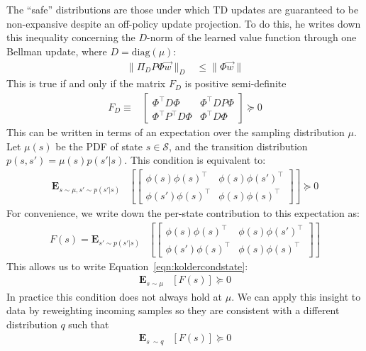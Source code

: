 \documentclass[11pt]{article}
\newcommand{\E}{\textbf{E}}
\begin{document}
The ``safe'' distributions are those under which TD updates are guaranteed to be non-expansive despite an off-policy update projection. To do this, he writes down this inequality concerning the $D$-norm of the learned value function through one Bellman update, where $D=\text{diag}(\mu)$:
\begin{align}
    \|\Pi_D P\Phi \vec w\|_D & \leq \|\Phi \vec w\|
\end{align}
This is true if and only if the matrix $F_D$ is positive semi-definite
\begin{align}
    F_D \equiv & \begin{bmatrix}
        \Phi^\top D \Phi & \Phi^\top D P \Phi \\
        \Phi^\top P^\top D \Phi & \Phi^\top D \Phi
    \end{bmatrix} \succcurlyeq 0 \label{eqn:koltercondmat}
\end{align}
This can be written in terms of an expectation over the sampling distribution $\mu$. Let $\mu(s)$ be the PDF of state $s \in \mathcal S$, and the transition distribution $p(s,s') = \mu(s) p(s'|s)$. This condition is equivalent to:
\begin{align}
  \E_{s\sim \mu, s'\sim p(s'|s)} & \left[\begin{bmatrix}
        \phi(s)\phi(s)^\top & \phi(s)\phi(s')^\top \\
        \phi(s')\phi(s)^\top & \phi(s)\phi(s)^\top
    \end{bmatrix}\right] \succcurlyeq 0 \label{eqn:koldercondstate}
\end{align}
For convenience, we write down the per-state contribution to this expectation as:
\begin{align}
F(s) = \E_{s'\sim p(s'|s)} & \left[\begin{bmatrix}
    \phi(s)\phi(s)^\top & \phi(s)\phi(s')^\top \\
    \phi(s')\phi(s)^\top & \phi(s)\phi(s)^\top
\end{bmatrix}\right]
\end{align}
This allows us to write Equation~\ref*{eqn:koldercondstate}:
\begin{align}
\E_{s\sim \mu} & [F(s)] \succcurlyeq 0
\end{align}
In practice this condition does not always hold at $\mu$. We can apply this insight to data by reweighting incoming samples so they are consistent with a different distribution $q$ such that
\begin{align}
\E_{s~\sim q} & [F(s)] \succcurlyeq 0
\end{align}
\end{document}

